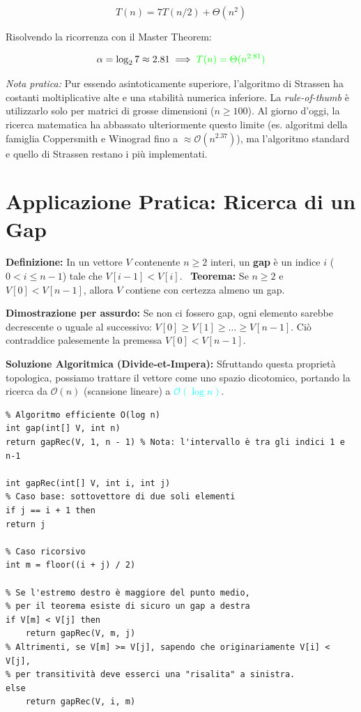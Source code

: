 \documentclass[12pt, a4paper]{article}
\begin{document}
$$T(n) = 7T(n/2) + \Theta(n^2)$$


Risolvendo la ricorrenza con il Master Theorem:


$$\alpha = \log_2 7 \approx 2.81 \implies \textcolor{green}{T(n) = \Theta(n^{2.81})}$$

\textit{Nota pratica:} Pur essendo asintoticamente superiore, l'algoritmo di Strassen ha costanti moltiplicative alte e una stabilità numerica inferiore. La \textit{rule-of-thumb} è utilizzarlo solo per matrici di grosse dimensioni ($n \ge 100$). Al giorno d'oggi, la ricerca matematica ha abbassato ulteriormente questo limite (es. algoritmi della famiglia Coppersmith e Winograd fino a $\approx \mathcal{O}(n^{2.37})$), ma l'algoritmo standard e quello di Strassen restano i più implementati.

\newpage

\section{Applicazione Pratica: Ricerca di un Gap}

\begin{tcolorbox}[colback=lightergray!10, colframe=tocsec, title=\textbf{Esercizio: Trovare il Gap}]
\textbf{Definizione:} In un vettore $V$ contenente $n \ge 2$ interi, un \textbf{gap} è un indice $i$ ($0 < i \le n-1$) tale che $V[i-1] < V[i]$. \
\textbf{Teorema:} Se $n \ge 2$ e \textbf{$V[0] < V[n-1]$}, allora $V$ contiene con certezza almeno un gap.
\end{tcolorbox}

\textbf{Dimostrazione per assurdo:}
Se non ci fossero gap, ogni elemento sarebbe decrescente o uguale al successivo: $V[0] \ge V[1] \ge \dots \ge V[n-1]$. Ciò contraddice palesemente la premessa $V[0] < V[n-1]$.

\textbf{Soluzione Algoritmica (Divide-et-Impera):}
Sfruttando questa proprietà topologica, possiamo trattare il vettore come uno spazio dicotomico, portando la ricerca da $\mathcal{O}(n)$ (scansione lineare) a \textcolor{cyan}{$\mathcal{O}(\log n)$}.

\begin{verbatim}
% Algoritmo efficiente O(log n)
int gap(int[] V, int n)
return gapRec(V, 1, n - 1) % Nota: l'intervallo è tra gli indici 1 e n-1

int gapRec(int[] V, int i, int j)
% Caso base: sottovettore di due soli elementi
if j == i + 1 then
return j

% Caso ricorsivo
int m = floor((i + j) / 2)

% Se l'estremo destro è maggiore del punto medio, 
% per il teorema esiste di sicuro un gap a destra
if V[m] < V[j] then
    return gapRec(V, m, j)
% Altrimenti, se V[m] >= V[j], sapendo che originariamente V[i] < V[j],
% per transitività deve esserci una "risalita" a sinistra.
else
    return gapRec(V, i, m)


\end{verbatim}
\end{document}
